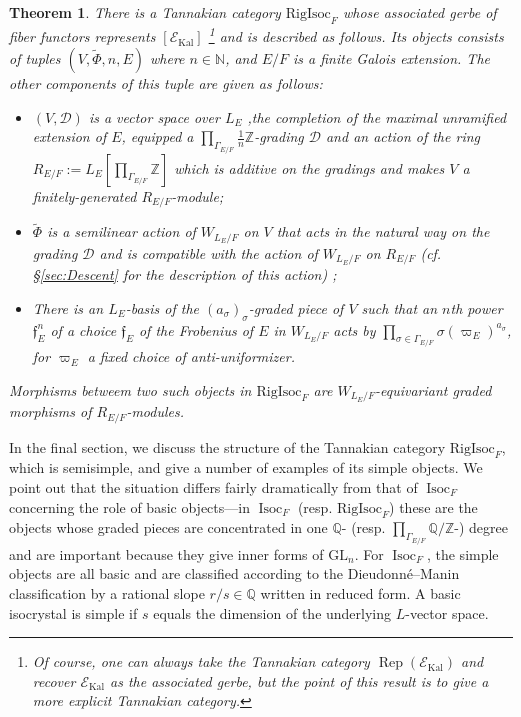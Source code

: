 \documentclass[11pt]{amsart}
\newtheorem{thm}{Theorem}[section]
\theoremstyle{definition}
\newcommand{\mc}{\mathcal}
\newcommand{\Z}{\mathbb{Z}}
\newcommand{\Q}{\mathbb{Q}}
\newcommand{\mf}{\mathfrak}
\newcommand{\N}{\mathbb{N}}
\newcommand{\RigIsoc}{\mathrm{RigIsoc}}
\newcommand{\GL}{\mathrm{GL}}
\DeclareMathOperator{\Kal}{Kal}
\DeclareMathOperator{\Rep}{Rep}
\DeclareMathOperator{\Isoc}{Isoc}
\begin{document}
\begin{thm}
    There is a Tannakian category $\RigIsoc_{F}$ whose associated gerbe of fiber functors represents $[\mc{E}_{\Kal}]$ \footnote{Of course, one can always take the Tannakian category $\Rep(\mc{E}_{\Kal})$ and recover $\mc{E}_{\Kal}$ as the associated gerbe, but the point of this result is to give a more explicit Tannakian category.} and is described as follows. Its objects consists of tuples $(V, \tilde{\Phi}, n, E)$ where $n \in \N$, and $E/F$ is a finite Galois extension. The other components of this tuple are given as follows:
    \begin{itemize}
    \item{$(V,\mc{D})$ is a vector space over $L_{E}$ ,the completion of the maximal unramified extension of $E$, equipped a $\prod\limits_{\Gamma_{E/F}} \frac{1}{n}\Z$-grading $\mc{D}$ and an action of the ring $R_{E/F} := L_{E}[\prod \limits_{\Gamma_{E/F}} \Z]$ which is additive on the gradings and makes $V$ a finitely-generated $R_{E/F}$-module;}
    \item{$\tilde{\Phi}$ is a semilinear action of $W_{L_E/F}$ on $V$ that acts in the natural way on the grading $\mc{D}$ and is compatible with the action of $W_{L_{E}/F}$ on $R_{E/F}$ (cf. \S \ref{sec:Descent} for the description of this action) ;}
    \item{
    There is an $L_E$-basis of the $(a_{\sigma})_{\sigma}$-graded piece of $V$ such that an $n$th power $\mf{f}^n_E$ of a choice $\mf{f}_{E}$ of the Frobenius of $E$ in $W_{L_{E}/F}$  acts by $\prod\limits_{\sigma \in \Gamma_{E/F}} \sigma(\varpi_E)^{a_{\sigma}}$, for $\varpi_E$ a fixed choice of anti-uniformizer.}
    \end{itemize}
    Morphisms betweem two such objects in $\RigIsoc_{F}$ are $W_{L_{E}/F}$-equivariant graded morphisms of $R_{E/F}$-modules.
\end{thm}

In the final section, we discuss the structure of the Tannakian category $\RigIsoc_{F}$, which is semisimple, and give a number of examples of its simple objects. We point out that the situation differs fairly dramatically from that of $\Isoc_F$ concerning the role of basic objects---in $\Isoc_{F}$ (resp. $\RigIsoc_{F}$) these are the objects whose graded pieces are concentrated in one $\Q$- (resp. $\prod_{\Gamma_{E/F}} \Q/\Z$-) degree and are important because they give inner forms of $\GL_{n}$. For $\Isoc_{F}$, the simple objects are all basic and are classified according  to the Dieudonn\'{e}--Manin classification by a rational slope $r/s \in \Q$ written in reduced form. A basic isocrystal is simple if $s$ equals the dimension of the underlying $L$-vector space. 
\end{document}
